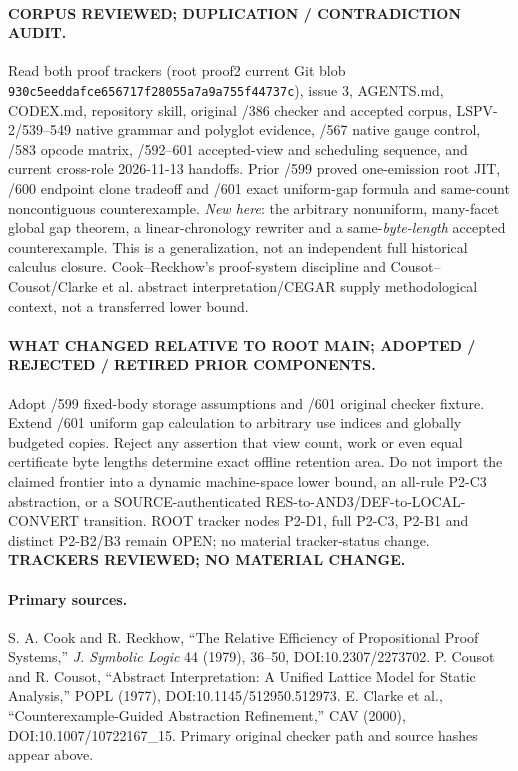 \paragraph{CORPUS REVIEWED; DUPLICATION / CONTRADICTION AUDIT.}
Read both proof trackers (root proof2 current Git blob \texttt{930c5eeddafce656717f28055a7a9a755f44737c}), issue 3, AGENTS.md, CODEX.md, repository skill, original /386 checker and accepted corpus, LSPV-2/539--549 native grammar and polyglot evidence, /567 native gauge control, /583 opcode matrix, /592--601 accepted-view and scheduling sequence, and current cross-role 2026-11-13 handoffs. Prior /599 proved one-emission root JIT, /600 endpoint clone tradeoff and /601 exact uniform-gap formula and same-count noncontiguous counterexample. \emph{New here}: the arbitrary nonuniform, many-facet global gap theorem, a linear-chronology rewriter and a same-\emph{byte-length} accepted counterexample. This is a generalization, not an independent full historical calculus closure. Cook--Reckhow's proof-system discipline and Cousot--Cousot/Clarke et al. abstract interpretation/CEGAR supply methodological context, not a transferred lower bound.

\paragraph{WHAT CHANGED RELATIVE TO ROOT MAIN; ADOPTED / REJECTED / RETIRED PRIOR COMPONENTS.}
Adopt /599 fixed-body storage assumptions and /601 original checker fixture. Extend /601 uniform gap calculation to arbitrary use indices and globally budgeted copies. Reject any assertion that view count, work or even equal certificate byte lengths determine exact offline retention area. Do not import the claimed frontier into a dynamic machine-space lower bound, an all-rule P2-C3 abstraction, or a SOURCE-authenticated RES-to-AND3/DEF-to-LOCAL-CONVERT transition. ROOT tracker nodes P2-D1, full P2-C3, P2-B1 and distinct P2-B2/B3 remain OPEN; no material tracker-status change. \textbf{TRACKERS REVIEWED; NO MATERIAL CHANGE.}

\paragraph{Primary sources.}
S. A. Cook and R. Reckhow, ``The Relative Efficiency of Propositional Proof Systems,'' \emph{J. Symbolic Logic} 44 (1979), 36--50, DOI:10.2307/2273702. P. Cousot and R. Cousot, ``Abstract Interpretation: A Unified Lattice Model for Static Analysis,'' POPL (1977), DOI:10.1145/512950.512973. E. Clarke et al., ``Counterexample-Guided Abstraction Refinement,'' CAV (2000), DOI:10.1007/10722167\_15. Primary original checker path and source hashes appear above.
